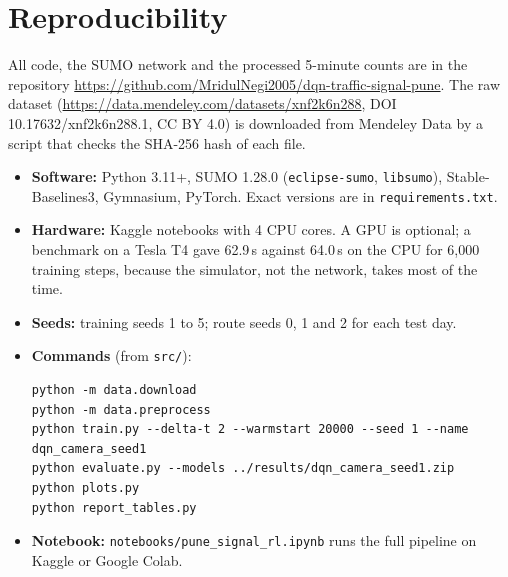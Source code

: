 \documentclass[12pt,a4paper]{article}
\newcommand{\repourl}{\url{https://github.com/MridulNegi2005/dqn-traffic-signal-pune}}
\begin{document}
\section{Reproducibility}
All code, the SUMO network and the processed 5-minute counts are in the repository \repourl.
The raw dataset (\url{https://data.mendeley.com/datasets/xnf2k6n288}, DOI 10.17632/xnf2k6n288.1,
CC BY 4.0) is downloaded from Mendeley Data by a script that checks the SHA-256 hash of each file.
\begin{itemize}
  \item \textbf{Software:} Python 3.11+, SUMO 1.28.0 (\texttt{eclipse-sumo}, \texttt{libsumo}),
        Stable-Baselines3, Gymnasium, PyTorch. Exact versions are in \texttt{requirements.txt}.
  \item \textbf{Hardware:} Kaggle notebooks with 4 CPU cores. A GPU is optional; a benchmark on a
        Tesla T4 gave 62.9\,s against 64.0\,s on the CPU for 6{,}000 training steps, because the
        simulator, not the network, takes most of the time.
  \item \textbf{Seeds:} training seeds 1 to 5; route seeds 0, 1 and 2 for each test day.
  \item \textbf{Commands} (from \texttt{src/}):
\begin{verbatim}
python -m data.download
python -m data.preprocess
python train.py --delta-t 2 --warmstart 20000 --seed 1 --name dqn_camera_seed1
python evaluate.py --models ../results/dqn_camera_seed1.zip
python plots.py
python report_tables.py
\end{verbatim}
  \item \textbf{Notebook:} \texttt{notebooks/pune\_signal\_rl.ipynb} runs the full pipeline on
        Kaggle or Google Colab.
\end{itemize}
\end{document}
